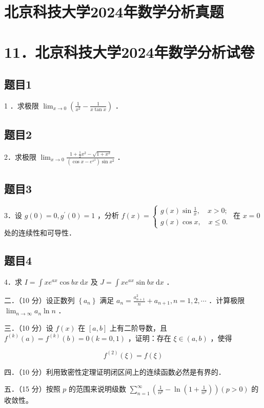 \documentclass{article}
\begin{document}
\section*{北京科技大学2024年数学分析真题}
\section*{11．北京科技大学2024年数学分析试卷}

\subsection{题目1}
1 ．求极限 \(\lim _{x \rightarrow 0}\left(\frac{1}{x^{2}}-\frac{1}{x \tan x}\right)\) ．

\subsection{题目2}
2．求极限 \(\lim _{x \rightarrow 0} \frac{1+\frac{1}{2} x^{2}-\sqrt{1+x^{2}}}{\left(\cos x-e^{x^{2}}\right) \sin x^{2}}\) ．

\subsection{题目3}
3．设 \(g(0)=0, g^{\prime}(0)=1\) ，分析 \(f(x)=\left\{\begin{array}{l}g(x) \sin \frac{1}{x}, \quad x>0 ; \\ g(x) \cos x, \quad x \leq 0 .\end{array}\right.\) 在 \(x=0\) 处的连续性和可导性．

\subsection{题目4}
4．求 \(I=\int x e^{a x} \cos b x \mathrm{~d} x\) 及 \(J=\int x e^{a x} \sin b x \mathrm{~d} x\) ．

二．（10 分）设正数列 \(\left\{a_{n}\right\}\) 满足 \(a_{n}=\frac{a_{n+1}^{2}}{n}+a_{n+1}, n=1,2, \cdots\) ．计算极限 \(\lim _{n \rightarrow \infty} a_{n} \ln n\) ．

三．（10 分）设 \(f(x)\) 在 \([a, b]\) 上有二阶导数，且 \(f^{(k)}(a)=f^{(k)}(b)=0(k=0,1)\) ，证明：存在 \(\xi \in(a, b)\) ，使得

\[
f^{(2)}(\xi)=f(\xi)
\]

四．（10 分）利用致密性定理证明闭区间上的连续函数必然是有界的．

五．（15 分）按照 \(p\) 的范围来说明级数 \(\sum_{n=1}^{\infty}\left(\frac{1}{n^{p}}-\ln \left(1+\frac{1}{n^{p}}\right)\right)(p>0)\) 的收敛性。
\end{document}

